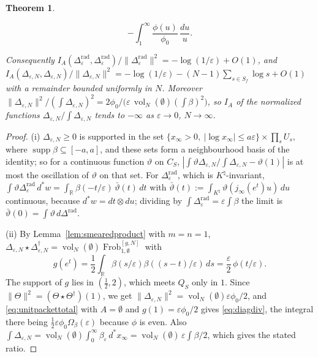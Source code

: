 \documentclass[11pt]{amsart}
\newtheorem{theorem}{Theorem}[section]
\theoremstyle{definition}
\newcommand{\R}{\mathbb R}
\newcommand{\Frob}{\operatorname{Frob}}
\newcommand{\supp}{\operatorname{supp}}
\newcommand{\vol}{\operatorname{vol}}
\newcommand{\Knat}{K^{\natural}}
\begin{document}
\begin{theorem}
\begin{enumerate}
\[   -\int_1^\infty\frac{\phi(u)}{\phi_0}\,\frac{du}u .
\]
\end{enumerate}
Consequently $I_A(\Delta^{\mathrm{rad}}_\varepsilon,\Delta^{\mathrm{rad}}_\varepsilon)/\|\Delta^{\mathrm{rad}}_\varepsilon\|^2
=-\log(1/\varepsilon)+O(1)$, and
$I_A(\Delta_{\varepsilon,N},\Delta_{\varepsilon,N})/\|\Delta_{\varepsilon,N}\|^2
=-\log(1/\varepsilon)-(N-1)\sum_{s\in S_f}\log s+O(1)$ with a remainder
bounded uniformly in $N$. Moreover
$\|\Delta_{\varepsilon,N}\|^2/(\int \Delta_{\varepsilon,N})^2
=2\phi_0\big/\bigl(\varepsilon\,\vol_N(\emptyset)(\int\beta)^2\bigr)$, so
$I_A$ of the normalized functions $\Delta_{\varepsilon,N}/\int \Delta_{\varepsilon,N}$
tends to $-\infty$ as $\varepsilon\to0$, $N\to\infty$.
\end{theorem}

\begin{proof}
(i) $\Delta_{\varepsilon,N}\ge0$ is supported in the set
$\{x_\infty>0,\ |\log x_\infty|\le a\varepsilon\}\times\prod_sU_s$, where
$\supp\beta\subseteq[-a,a]$, and these sets form a neighbourhood basis of the
identity; so for a continuous function $\vartheta$ on $C_S$,
$|\int\vartheta\Delta_{\varepsilon,N}/\int\Delta_{\varepsilon,N}
-\vartheta(1)|$ is at most the oscillation of $\vartheta$ on that set. For
$\Delta^{\mathrm{rad}}_\varepsilon$, which is $\Knat$-invariant,
$\int\vartheta\Delta^{\mathrm{rad}}_\varepsilon\,d^*w
=\int_\R\beta(-t/\varepsilon)\,\bar\vartheta(t)\,dt$ with
$\bar\vartheta(t):=\int_{\Knat}\vartheta(j_\infty(e^t)u)\,du$ continuous,
because $d^*w=dt\otimes du$; dividing by
$\int\Delta^{\mathrm{rad}}_\varepsilon=\varepsilon\int\beta$ the limit is
$\bar\vartheta(0)=\int\vartheta\,d\Delta^{\mathrm{rad}}$.

(ii) By Lemma~\ref{lem:smearedproduct} with $m=n=1$,
$\Delta_{\varepsilon,N}\star \Delta_{\varepsilon,N}^\dagger
=\vol_N(\emptyset)\Frob_{1,\emptyset}^{[g,N]}$ with
\[
  g(e^t)=\frac12\int_\R\beta(s/\varepsilon)\beta((s-t)/\varepsilon)\,ds
   =\frac\varepsilon2\,\phi(t/\varepsilon).
\]
The support of $g$ lies in $(\tfrac12,2)$, which meets $Q_S$ only in $1$.
Since $\|\Theta\|^2=(\Theta\star\Theta^\dagger)(1)$, we get
$\|\Delta_{\varepsilon,N}\|^2=\vol_N(\emptyset)\varepsilon\phi_0/2$, and
\eqref{eq:unitpackettotal} with $A=\emptyset$ and $g(1)=\varepsilon\phi_0/2$
gives \eqref{eq:diagdiv}, the integral there being
$\tfrac12\varepsilon\phi_0\Omega_\beta(\varepsilon)$ because $\phi$ is even.
Also $\int \Delta_{\varepsilon,N}=\vol_N(\emptyset)\int_0^\infty\beta_\varepsilon\,
d^*x_\infty=\vol_N(\emptyset)\,\varepsilon\int\beta/2$, which gives the stated
ratio.


\end{proof}
\end{document}
